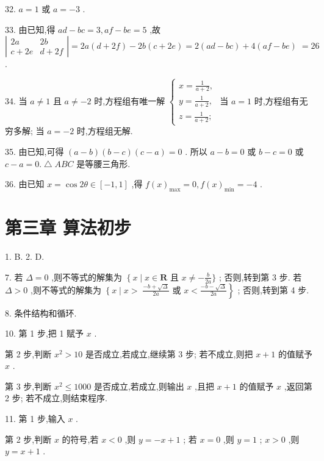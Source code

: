 \documentclass[10pt]{article}
\begin{document}
32. \(a = 1\) 或 \(a =  - 3\) .

33. 由已知,得 \({ad} - {bc} = 3,{af} - {be} = 5\) ,故 \(\left| \begin{matrix} {2a} & {2b} \\  c + {2e} & d + {2f} \end{matrix}\right|  = {2a}\left( {d + {2f}}\right)  - {2b}\left( {c + {2e}}\right)  = 2\left( {{ad} - {bc}}\right)  + 4\left( {{af} - {be}}\right) \; = {26}\) .

34. 当 \(a \neq  1\) 且 \(a \neq   - 2\) 时,方程组有唯一解 \(\left\{  \begin{array}{l} x = \frac{1}{a + 2}, \\  y = \frac{1}{a + 2}, \\  z = \frac{1}{a + 2}; \end{array}\right.\) 当 \(a = 1\) 时,方程组有无穷多解; 当 \(a =  - 2\) 时,方程组无解.

35. 由已知,可得 \(\left( {a - b}\right) \left( {b - c}\right) \left( {c - a}\right)  = 0\) . 所以 \(a - b = 0\) 或 \(b - c = 0\) 或 \(c - a = 0.\bigtriangleup {ABC}\) 是等腰三角形.

36. 由已知 \(x = \cos {2\theta } \in  \left\lbrack  {-1,1}\right\rbrack\) ,得 \(f{\left( x\right) }_{\max } = 0,f{\left( x\right) }_{\min } =  - 4\) .

\section*{第三章 算法初步}

1. B. 2. D.

7. 若 \(\Delta  = 0\) ,则不等式的解集为 \(\left\{  {x \mid  x \in  \mathbf{R}}\right.\) 且 \(x \neq   - \frac{b}{2a}\}\) ; 否则,转到第 3 步. 若 \(\Delta  > 0\) ,则不等式的解集为 \(\left\{  {x \mid  x > }\right. \; \left. {\frac{-b + \sqrt{\Delta }}{2a}\text{ 或 }x < \frac{-b - \sqrt{\Delta }}{2a}}\right\}\) ; 否则,转到第 4 步.

8. 条件结构和循环.

10. 第 1 步,把 1 赋予 \(x\) .

第 2 步,判断 \({x}^{2} > {10}\) 是否成立,若成立,继续第 3 步; 若不成立,则把 \(x + 1\) 的值赋予 \(x\) .

第 3 步,判断 \({x}^{2} \leq  {1000}\) 是否成立,若成立,则输出 \(x\) ,且把 \(x + 1\) 的值赋予 \(x\) ,返回第 2 步; 若不成立,则结束程序.

11. 第 1 步,输入 \(x\) .

第 2 步,判断 \(x\) 的符号,若 \(x < 0\) ,则 \(y =  - x + 1\) ; 若 \(x = 0\) ,则 \(y = 1\) ; \(x > 0\) ,则 \(y = x + 1\) .
\end{document}
